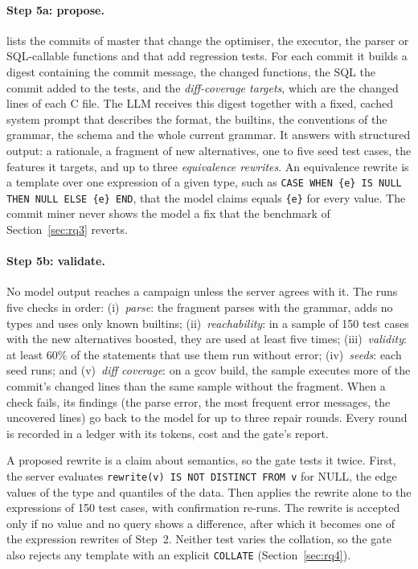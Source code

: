 \paragraph{Step 5a: propose.} \tool lists the commits of \pg master that change
the optimiser, the executor, the parser or SQL-callable functions and that add
regression tests. For each commit it builds a digest containing the commit
message, the changed functions, the SQL the commit added to the tests, and the
\emph{diff-coverage targets}, which are the changed lines of each C file. The
LLM receives this digest together with a fixed, cached system prompt that
describes the \pgg format, the builtins, the conventions of the grammar, the
schema and the whole current grammar. It answers with structured output: a
rationale, a fragment of new alternatives, one to five seed test cases, the
features it targets, and up to three \emph{equivalence rewrites}. An
equivalence rewrite is a template over one expression of a given type, such as
\texttt{CASE WHEN \{e\} IS NULL THEN NULL ELSE \{e\} END}, that the model claims
equals \texttt{\{e\}} for every value. The commit miner never shows the model a
fix that the benchmark of Section~\ref{sec:rq3} reverts.

\paragraph{Step 5b: validate.} No model output reaches a campaign unless the
server agrees with it. The \gate runs five checks in order: (i)~\emph{parse}:
the fragment parses with the grammar, adds no types and uses only known
builtins; (ii)~\emph{reachability}: in a sample of 150 test cases with the new
alternatives boosted, they are used at least five times; (iii)~\emph{validity}:
at least 60\% of the statements that use them run without error;
(iv)~\emph{seeds}: each seed runs; and (v)~\emph{diff coverage}: on a gcov build,
the sample executes more of the commit's changed lines than the same sample
without the fragment. When a check fails, its findings (the parse error, the
most frequent error messages, the uncovered lines) go back to the model for up
to three repair rounds. Every round is recorded in a ledger with its tokens,
cost and the gate's report.

A proposed rewrite is a claim about semantics, so the gate tests it twice.
First, the server evaluates \texttt{rewrite(v) IS NOT DISTINCT FROM v} for NULL,
the edge values of the type and quantiles of the data. Then \tool applies the
rewrite alone to the expressions of 150 test cases, with confirmation re-runs.
The rewrite is accepted only if no value and no query shows a difference, after
which it becomes one of the expression rewrites of Step~2. Neither test varies
the collation, so the gate also rejects any template with an explicit
\texttt{COLLATE} (Section~\ref{sec:rq4}).
